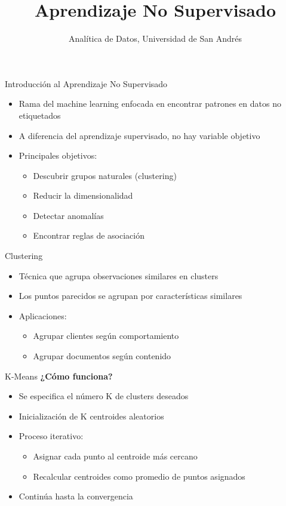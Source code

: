 \documentclass{beamer}
\title{\Huge\textbf{Aprendizaje No Supervisado}}
\author{Analítica de Datos, Universidad de San Andrés}
\date{}
\begin{document}
\begin{frame}
    \titlepage
\end{frame}

\begin{frame}{Introducción al Aprendizaje No Supervisado}
    \begin{itemize}
        \item<1-> Rama del machine learning enfocada en encontrar patrones en datos no etiquetados
        \item<2-> A diferencia del aprendizaje supervisado, no hay variable objetivo
        \item<3-> Principales objetivos:
        \begin{itemize}
            \item Descubrir grupos naturales (clustering)
            \item Reducir la dimensionalidad
            \item Detectar anomalías
            \item Encontrar reglas de asociación
        \end{itemize}
    \end{itemize}
\end{frame}

\begin{frame}{Clustering}
    \begin{itemize}
        \item<1-> Técnica que agrupa observaciones similares en clusters
        \item<2-> Los puntos parecidos se agrupan por características similares
        \item<3-> Aplicaciones:
        \begin{itemize}
            \item Agrupar clientes según comportamiento
            \item Agrupar documentos según contenido
        \end{itemize}
    \end{itemize}
\end{frame}

\begin{frame}{K-Means}
    \textbf{¿Cómo funciona?}
    \begin{itemize}
        \item<1-> Se especifica el número K de clusters deseados
        \item<2-> Inicialización de K centroides aleatorios
        \item<3-> Proceso iterativo:
        \begin{itemize}
            \item Asignar cada punto al centroide más cercano
            \item Recalcular centroides como promedio de puntos asignados
        \end{itemize}
        \item<4-> Continúa hasta la convergencia
    \end{itemize}
\end{frame}
\end{document}
